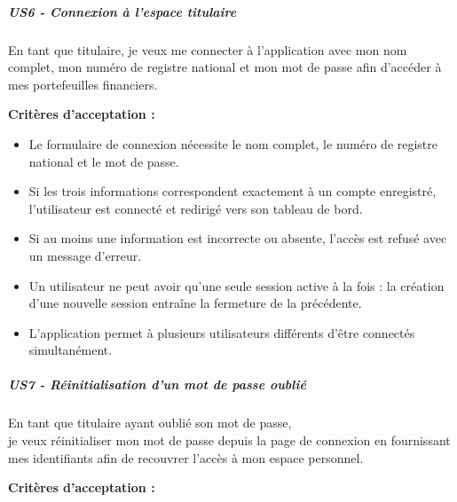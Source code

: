 \hypertarget{us6---connexion-uxe0-lespace-titulaire}{%
\subparagraph{US6 - Connexion à l'espace
titulaire}\label{us6---connexion-uxe0-lespace-titulaire}}

En tant que titulaire, je veux me connecter à l'application avec mon nom
complet, mon numéro de registre national et mon mot de passe afin
d'accéder à mes portefeuilles financiers.

\textbf{Critères d'acceptation :}

\begin{itemize}
\tightlist
\item
  Le formulaire de connexion nécessite le nom complet, le numéro de
  registre national et le mot de passe.
\item
  Si les trois informations correspondent exactement à un compte
  enregistré, l'utilisateur est connecté et redirigé vers son tableau de
  bord.
\item
  Si au moins une information est incorrecte ou absente, l'accès est
  refusé avec un message d'erreur.
\item
  Un utilisateur ne peut avoir qu'une seule session active à la fois :
  la création d'une nouvelle session entraîne la fermeture de la
  précédente.
\item
  L'application permet à plusieurs utilisateurs différents d'être
  connectés simultanément.
\end{itemize}

\hypertarget{us7---ruxe9initialisation-dun-mot-de-passe-oubliuxe9}{%
\subparagraph{US7 - Réinitialisation d'un mot de passe
oublié}\label{us7---ruxe9initialisation-dun-mot-de-passe-oubliuxe9}}

En tant que titulaire ayant oublié son mot de passe,\\
je veux réinitialiser mon mot de passe depuis la page de connexion en
fournissant mes identifiants afin de recouvrer l'accès à mon espace
personnel.

\textbf{Critères d'acceptation :}

